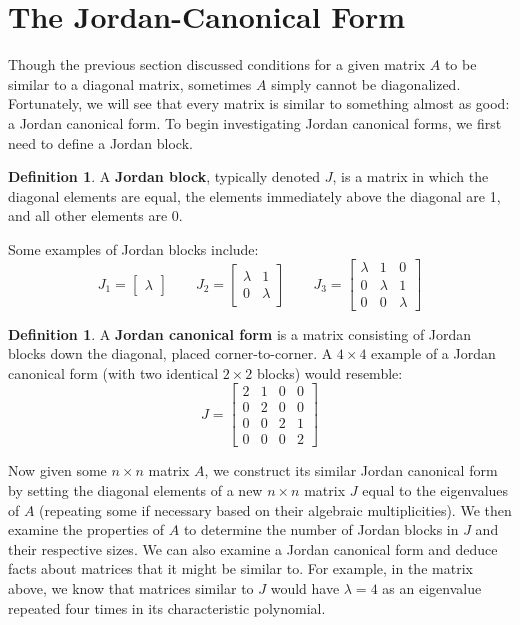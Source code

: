 \documentclass[11pt]{amsart}
\theoremstyle{definition}
\newtheorem{definition}[theorem]{Definition}
\begin{document}
\section{The Jordan-Canonical Form}
Though the previous section discussed conditions for a given matrix $A$ to be similar to a diagonal matrix, sometimes $A$ simply cannot
be diagonalized. Fortunately, we will see that every matrix is similar to something almost as good: a Jordan canonical form. To begin investigating
Jordan canonical forms, we first need to define a Jordan block.
\begin{definition}
	A \textbf{Jordan block}, typically denoted $J$, is a matrix in which the diagonal elements are equal, the elements immediately above the 
	diagonal are 1, and all other elements are 0.
\end{definition}
Some examples of Jordan blocks include:
\[
	J_1 = \begin{bmatrix} \lambda \end{bmatrix} \qquad J_2 = \begin{bmatrix} \lambda & 1 \\ 0 & \lambda \end{bmatrix} \qquad
	J_3 = \begin{bmatrix} \lambda & 1 & 0 \\ 0 & \lambda & 1 \\ 0 & 0 & \lambda \end{bmatrix}
\]
\begin{definition}
	A \textbf{Jordan canonical form} is a matrix consisting of Jordan blocks down the diagonal, placed corner-to-corner.
	A $4 \times 4$ example of a Jordan canonical form (with two identical $2 \times 2$ blocks) would resemble:
	\[
		J = \begin{bmatrix} 2 & 1 & 0 & 0 \\ 0 & 2 & 0 & 0 \\ 0 & 0 & 2 & 1 \\ 0 & 0 & 0 & 2 \end{bmatrix}
	\]
\end{definition}
Now given some $n \times n$ matrix $A$, we construct its similar Jordan canonical form by setting the diagonal elements of a new $n \times n$
matrix $J$ equal to the eigenvalues of $A$ (repeating some if necessary based on their algebraic multiplicities). We then examine the
properties of $A$ to determine the number of Jordan blocks in $J$ and their respective sizes. We can also examine a Jordan canonical form
and deduce facts about matrices that it might be similar to. For example, in the matrix above, we know that matrices similar to $J$ would have
$\lambda = 4$ as an eigenvalue repeated four times in its characteristic polynomial.
\end{document}
